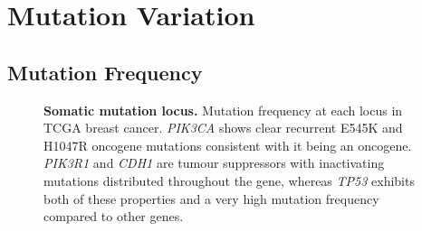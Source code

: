 \clearpage
\section{Mutation Variation}
\subsection{Mutation Frequency}


\begin{figure}[!ht]
\begin{mdframed}
        \begin{center}
%
    \end{center}
    \caption[Somatic mutation locus]{\small \textbf{Somatic mutation locus.} Mutation frequency at each locus in TCGA breast cancer. \textit{PIK3CA} shows clear recurrent E545K and H1047R oncogene mutations consistent with it being an oncogene. \textit{PIK3R1} and \textit{CDH1} are tumour suppressors with inactivating mutations distributed throughout the gene, whereas \textit{TP53} exhibits both of these properties and a very high mutation frequency compared to other genes.
}
\label{fig:mutation_locus}
\end{mdframed}
\end{figure}

